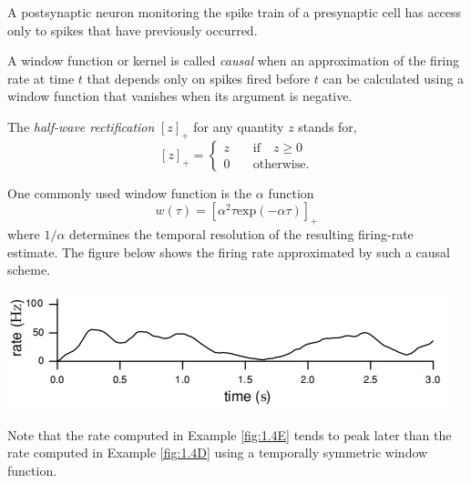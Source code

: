 \begin{prin}
  A postsynaptic neuron monitoring the spike train of a presynaptic cell has
access only to spikes that have previously occurred.
\end{prin}

\begin{defn}
  A window function or kernel is called \emph{causal} when an approximation
of the firing rate at time $t$ that depends only on spikes fired before $t$ can
be calculated using a window function that vanishes when its argument is negative.

\end{defn}

\begin{defn}
  The \emph{half-wave rectification} $[z]_+$ for any quantity $z$ stands for,
\begin{equation}
  \label{equ:1.13}
  [z]_+ =\left\{
    \begin{aligned}
      z \quad &\text{if} \quad z\geqslant 0\\
      0 \quad & \text{otherwise}.
    \end{aligned}
  \right.
\end{equation}
\end{defn}

\begin{exm}
  \label{fig:1.4E}
  One commonly used window function is the $\alpha$ function
  \begin{equation}
    w(\tau)=[\alpha^2 \tau \text{exp}(-\alpha\tau) ]_+ 
  \end{equation}
  where $1/\alpha$ determines the temporal resolution of the resulting firing-rate
 estimate. The figure below shows the firing rate approximated by such a causal scheme.
\end{exm}

\begin{center}
  \includegraphics[scale=0.72]{./png/fig_1_4E.png}
\end{center}

\begin{rem}
  Note that the rate computed in Example \ref{fig:1.4E} tends to peak later than the 
  rate computed in Example \ref{fig:1.4D} using a temporally symmetric window function.%
\end{rem}

